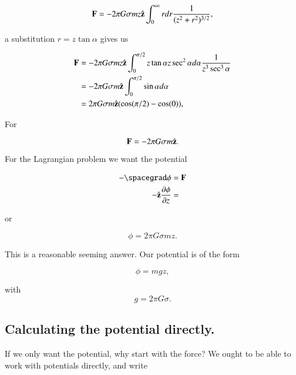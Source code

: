 \begin{equation}\label{eqn:infiniteSheetPotentials:10}
\mathbf{F} = - 2 \pi G \sigma m z \hat{\mathbf{z}} \int_0^\infty r dr \frac{1}{(z^2 + r^2)^{3/2} },
\end{equation}

a substitution $r = z \tan \alpha$ gives us

\begin{align*}
\mathbf{F}
&= - 2 \pi G \sigma m z \hat{\mathbf{z}} \int_0^{\pi/2} z \tan \alpha z \sec^2 \alpha d\alpha \frac{1}{z^3 \sec^3 \alpha } \\
&= - 2 \pi G \sigma m \hat{\mathbf{z}} \int_0^{\pi/2} \sin \alpha d\alpha \\
&= 2 \pi G \sigma m \hat{\mathbf{z}} (\cos(\pi/2) - \cos(0)),
\end{align*}

For

\begin{equation}\label{eqn:infiniteSheetPotentials:30}
\mathbf{F} = -2 \pi G \sigma m \hat{\mathbf{z}}.
\end{equation}

For the Lagrangian problem we want the potential

\begin{align*}
-\spacegrad \phi &= \BF \\
-\zcap \PD{z}{\phi} &= \\
\end{align*}

or

\begin{equation}\label{eqn:infiniteSheetPotentials:50}
\phi = 2 \pi G \sigma m z.
\end{equation}

This is a reasonable seeming answer.  Our potential is of the form

\begin{equation}\label{eqn:infiniteSheetPotentials:70}
\phi = m g z,
\end{equation}

with
\begin{equation}\label{eqn:infiniteSheetPotentials:90}
g = 2 \pi G \sigma.
\end{equation}

\subsection{Calculating the potential directly.}

If we only want the potential, why start with the force?  We ought to be able to work with potentials directly, and write

